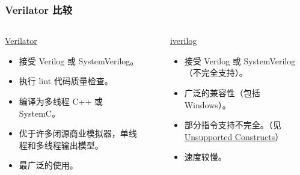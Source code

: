 \documentclass[xcolor=table,dvipsnames,svgnames,aspectratio=169]{ctexbeamer}
\begin{document}
\begin{frame}
  \frametitle{Verilator 比较}
  \begin{columns}[T]
    \begin{column}{.5\textwidth}
      \begin{stampblock}[1]{\href{https://github.com/verilator/verilator/}{Verilator}}
        \begin{itemize}
          \item 接受 Verilog 或 SystemVerilog。
          \item 执行 lint 代码质量检查。
          \item 编译为多线程 C++ 或 SystemC。
          \item 优于许多闭源商业模拟器，单线程和多线程输出模型。
          \item 最广泛的使用。
        \end{itemize}
      \end{stampblock}
    \end{column}
    \textcolor{cprimary}{\vrule}\hfill
    \begin{column}{.5\textwidth}
      \begin{stampblock}[1]{\href{https://github.com/steveicarus/iverilog}{iverilog}}
        \begin{itemize}
          \item 接受 Verilog 或 SystemVerilog （不完全支持）。
          \item 广泛的兼容性（包括 Windows\textsuperscript{\circledR{}}）。
          \item 部分指令支持不完全。（见 \href{https://github.com/steveicarus/iverilog/blob/master/README.md\#unsupported-constructs}{Unsupported Constructs}）
          \item 速度较慢。
        \end{itemize}
      \end{stampblock}
    \end{column}
  \end{columns}
\end{frame}
\end{document}
